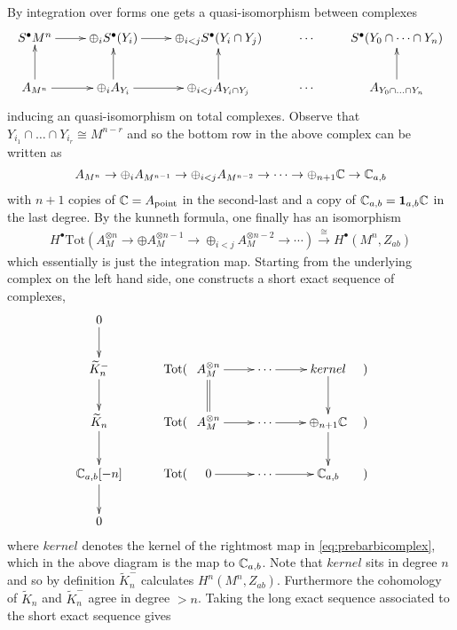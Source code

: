 By integration over forms one gets a quasi-isomorphism between complexes
\[
\begin{xy}
\xymatrix{
S^\bullet M^n \ar[r] & \oplus_i S^\bullet(Y_i) \ar[r] & \oplus_{i < j} S^\bullet(Y_i \cap Y_j) & \cdots & S^\bullet(Y_0 \cap \cdots \cap Y_n) \\
A_{M^{n}} \ar[r] \ar[u] & \oplus_i A_{Y_i} \ar[r] \ar[u] & \oplus_{i < j} A_{Y_i \cap Y_j} \ar[u] & \cdots & A_{Y_0 \cap \ldots \cap Y_n} \ar[u]
}
\end{xy}
\]
inducing an quasi-isomorphism on total complexes. Observe that $Y_{i_1} \cap \ldots \cap Y_{i_r} \cong M^{n-r}$ and so the bottom row in the above complex can be written as
\begin{align} \label{eq:prebarbicomplex}
A_{M^n} \to \oplus_i A_{M^{n-1}} \to \oplus_{i < j} A_{M^{n-2}} \to \cdots \to \oplus_{n+1} \mathbb{C} \to \mathbb{C}_{a,b} 
\end{align}
with $n+1$ copies of $\mathbb{C} = A_{\text{point}}$ in the second-last and a copy of $\mathbb{C}_{a,b} = \mathbf{1}_{a,b} \mathbb{C}$ in the last degree.
By the kunneth formula, one finally has an isomorphism 
\begin{align*}
H^\bullet \textrm{Tot}(A_M^{\otimes n} \to \oplus A_M^{\otimes n-1} \to \oplus_{i < j} A_M^{\otimes n-2} \to \cdots) \xrightarrow{\cong} H^\bullet (M^n, Z_{ab})
\end{align*}
which essentially is just the integration map. 
Starting from the underlying complex on the left hand side, one constructs a short exact sequence of complexes, 
%
\[
\xymatrix{
0 \ar[d] & & & & \\
\widetilde{K}_n^{-} \ar[d] & \rlap{\ Tot(} & A_M^{\otimes n} \ar@{=}[d] \ar[r] & \cdots \ar[r] & kernel \ar[d] & \llap{) \quad } \\
\widetilde{K}_n \ar[d] & \rlap{\ Tot(} & A_M^{\otimes n} \ar[r] & \cdots \ar[r] & \oplus_{n+1} \C \ar[d] & \llap{) \quad } \\
\C_{a,b}[-n] \ar[d]  & \rlap{\ Tot(} & 0 \ar[r] & \cdots \ar[r] & \C_{a, b} & \llap{) \quad } \\
0 & & &
}
\]
where $kernel$ denotes the kernel of the rightmost map in \eqref{eq:prebarbicomplex}, which in the above diagram is the map to $\mathbb{C}_{a,b}$. 
Note that $kernel$ sits in degree $n$ and so by definition $\widetilde{K}_n^{-}$ calculates $H^n(M^n, Z_{ab})$. Furthermore the cohomology of $\widetilde K_n$ and $\widetilde K_n^-$ agree in degree $>n$. Taking the long exact sequence associated to the short exact sequence gives
